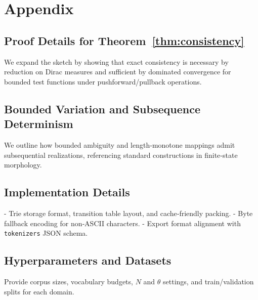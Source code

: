 \section{Appendix}

\subsection{Proof Details for Theorem~\ref{thm:consistency}}

We expand the sketch by showing that exact consistency is necessary by reduction on Dirac measures and sufficient by dominated convergence for bounded test functions under pushforward/pullback operations.

\subsection{Bounded Variation and Subsequence Determinism}

We outline how bounded ambiguity and length‑monotone mappings admit subsequential realizations, referencing standard constructions in finite‑state morphology.

\subsection{Implementation Details}

- Trie storage format, transition table layout, and cache‑friendly packing.
- Byte fallback encoding for non‑ASCII characters.
- Export format alignment with \texttt{tokenizers} JSON schema.

\subsection{Hyperparameters and Datasets}

Provide corpus sizes, vocabulary budgets, $N$ and $\theta$ settings, and train/validation splits for each domain.
